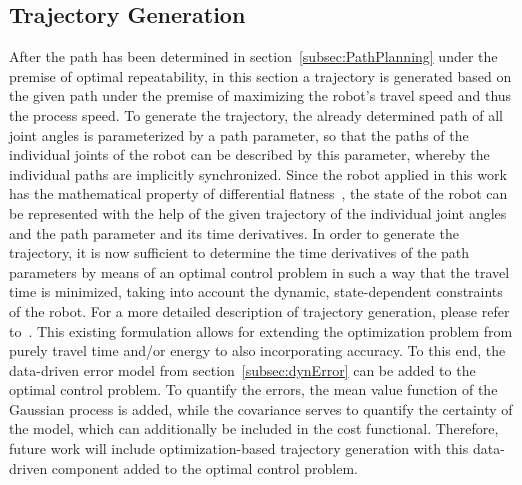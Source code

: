 \documentclass[5p,times,procedia]{elsarticle}
\begin{document}
\subsection{Trajectory Generation}
After the path has been determined in section~\ref{subsec:PathPlanning} under the premise of optimal repeatability, in this section a trajectory is generated based on the given path under the premise of maximizing the robot’s travel speed and thus the process speed.
To generate the trajectory, the already determined path of all joint angles is parameterized by a path parameter, so that the paths of the individual joints of the robot can be described by this parameter, whereby the individual paths are implicitly synchronized.
Since the robot applied in this work has the mathematical property of differential flatness~\cite{Hoffmann23}, the state of the robot can be represented with the help of the given trajectory of the individual joint angles and the path parameter and its time derivatives.
In order to generate the trajectory, it is now sufficient to determine the time derivatives of the path parameters by means of an optimal control problem in such a way that the travel time is minimized, taking into account the dynamic, state-dependent constraints of the robot. 
For a more detailed description of trajectory generation, please refer to~\cite{Kanagalingam24}.
%
This existing formulation allows for extending the optimization problem from purely travel time and/or energy to also incorporating accuracy.
To this end, the data-driven error model from section~\ref{subsec:dynError} can be added to the optimal control problem.
To quantify the errors, the mean value function of the Gaussian process is added, while the covariance serves to quantify the certainty of the model, which can additionally be included in the cost functional.
Therefore, future work will include optimization-based trajectory generation with this data-driven component added to the optimal control problem.
%
\end{document}
